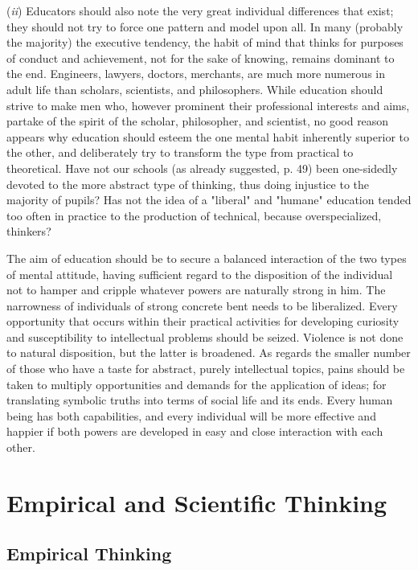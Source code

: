 \documentclass[letterpaper]{book}
\begin{document}
(\emph{ii}) Educators should also note the very great individual
differences that exist; they should not try to force one pattern and
model upon all. In many (probably the majority) the executive tendency,
the habit of mind that thinks for purposes of conduct and achievement,
not for the sake of knowing, remains dominant to the end. Engineers,
lawyers, doctors, merchants, are much more numerous in adult life than
scholars, scientists, and philosophers. While education should strive to
make men who, however prominent their professional interests and aims,
partake of the spirit of the scholar, philosopher, and scientist, no
good reason appears why education should esteem the one mental habit
inherently superior to the other, and deliberately try to transform the
type from practical to theoretical. Have not our schools (as already
suggested, p. 49) been one-sidedly devoted to the more abstract type of
thinking, thus doing injustice to the majority of pupils? Has not the
idea of a "liberal" and "humane" education tended too often in practice
to the production of technical, because overspecialized, thinkers?


The aim of education should be to secure a balanced interaction of the
two types of mental attitude, having sufficient regard to the
disposition of the individual not to hamper and cripple whatever powers
are naturally strong in him. The narrowness of individuals of strong
concrete bent needs to be liberalized. Every
opportunity
that occurs within their practical activities for developing curiosity
and susceptibility to intellectual problems should be seized. Violence
is not done to natural disposition, but the latter is broadened. As
regards the smaller number of those who have a taste for abstract,
purely intellectual topics, pains should be taken to multiply
opportunities and demands for the application of ideas; for translating
symbolic truths into terms of social life and its ends. Every human
being has both capabilities, and every individual will be more effective
and happier if both powers are developed in easy and close interaction
with each
other.

\chapter{Empirical and Scientific Thinking}

\section{Empirical Thinking}
\end{document}
